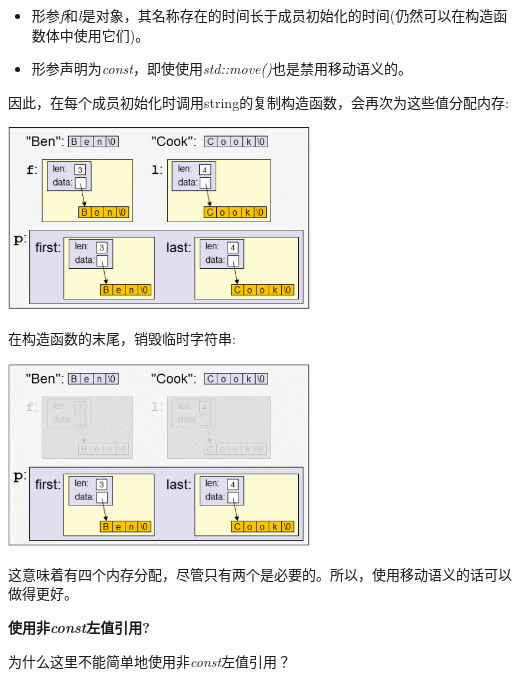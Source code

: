 \begin{itemize}
	\item 形参\textit{f}和\textit{l}是对象，其名称存在的时间长于成员初始化的时间(仍然可以在构造函数体中使用它们)。
	\item 形参声明为\textit{const}，即使使用\textit{std::move()}也是禁用移动语义的。
\end{itemize}

因此，在每个成员初始化时调用string的复制构造函数，会再次为这些值分配内存:\par

\begin{center}
	\includegraphics[width=0.6\textwidth]{content/1/chapter4/images/2}
\end{center}

在构造函数的末尾，销毁临时字符串:\par

\begin{center}
	\includegraphics[width=0.6\textwidth]{content/1/chapter4/images/3}
\end{center}

这意味着有四个内存分配，尽管只有两个是必要的。所以，使用移动语义的话可以做得更好。\par

\hspace*{\fill} \par %
\textbf{使用非\textit{const}左值引用?}

为什么这里不能简单地使用非\textit{const}左值引用？\par

